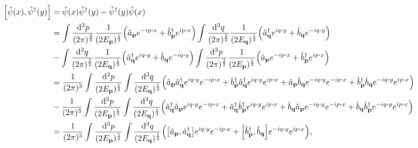 \documentclass{article}
\begin{document}
\begin{align*}
    \bqty{\hat{\psi}(x),\hat{\psi}^\dagger (y)} & =\hat{\psi}(x)\hat{\psi}^\dagger(y) - \hat{\psi}^\dagger(y)\hat{\psi}(x)                                                                                                                                                                                                                                                                                                                                            \\
                                                & =\int \frac{\dd[3]{p}}{(2\pi)^\frac{3}{2}}  \frac{1}{(2E_{\vb{p}})^{\frac{1}{2}}}  \pqty{\hat{a}_{\vb{p}}e^{-ip\vdot x}+\hat{b}^\dagger_{\vb{p}}e^{ip\vdot x}}\int \frac{\dd[3]{q}}{(2\pi)^\frac{3}{2}}  \frac{1}{(2E_{\vb{q}})^{\frac{1}{2}}}\pqty{\hat{a}^\dagger_{\vb{q}}e^{iq\vdot y}+\hat{b}_{\vb{q}}e^{-iq\vdot y}}                                                                                           \\
                                                & -\int \frac{\dd[3]{q}}{(2\pi)^\frac{3}{2}}  \frac{1}{(2E_{\vb{q}})^{\frac{1}{2}}}\pqty{\hat{a}^\dagger_{\vb{q}}e^{iq\vdot y}+\hat{b}_{\vb{q}}e^{-iq\vdot y}}\int \frac{\dd[3]{p}}{(2\pi)^\frac{3}{2}}  \frac{1}{(2E_{\vb{p}})^{\frac{1}{2}}}  \pqty{\hat{a}_{\vb{p}}e^{-ip\vdot x}+\hat{b}^\dagger_{\vb{p}}e^{ip\vdot x}}                                                                                           \\
                                                & =\frac{1}{(2\pi)^3}\int\frac{\dd[3]{p}}{(2E_{\vb{p}})^{\frac{1}{2}}}\int   \frac{\dd[3]{q}}{(2E_{\vb{q}})^{\frac{1}{2}}}     \pqty{\hat{a}_{\vb{p}}\hat{a}^\dagger_{\vb{q}}e^{iq\vdot y}e^{-ip\vdot x}+\hat{b}^\dagger_{\vb{p}}\hat{a}^\dagger_{\vb{q}}e^{iq\vdot y}e^{ip\vdot x}+\hat{a}_{\vb{p}}\hat{b}_{\vb{q}}e^{-iq\vdot y}e^{-ip\vdot x}+\hat{b}^\dagger_{\vb{p}}\hat{b}_{\vb{q}}e^{-iq\vdot y}e^{ip\vdot x}} \\
                                                & -\frac{1}{(2\pi)^3}\int\frac{\dd[3]{p}}{(2E_{\vb{p}})^{\frac{1}{2}}}\int   \frac{\dd[3]{q}}{(2E_{\vb{q}})^{\frac{1}{2}}}     \pqty{\hat{a}^\dagger_{\vb{q}}\hat{a}_{\vb{p}}e^{iq\vdot y}e^{-ip\vdot x}+\hat{a}^\dagger_{\vb{q}}\hat{b}^\dagger_{\vb{p}}e^{iq\vdot y}e^{ip\vdot x}+\hat{b}_{\vb{q}}\hat{a}_{\vb{p}}e^{-iq\vdot y}e^{-ip\vdot x}+\hat{b}_{\vb{q}}\hat{b}^\dagger_{\vb{p}}e^{-iq\vdot y}e^{ip\vdot x}} \\
                                                & =\frac{1}{(2\pi)^3}\int\frac{\dd[3]{p}}{(2E_{\vb{p}})^{\frac{1}{2}}}\int   \frac{\dd[3]{q}}{(2E_{\vb{q}})^{\frac{1}{2}}}     \pqty{\bqty{\hat{a}_{\vb{p}},\hat{a}^\dagger_{\vb{q}}}e^{iq\vdot y}e^{-ip\vdot x}+\bqty{\hat{b}^\dagger_{\vb{p}},\hat{b}_{\vb{q}}}e^{-iq\vdot y}e^{ip\vdot x}}\qcomma                                                                                                                  \\

\end{align*}
\end{document}
